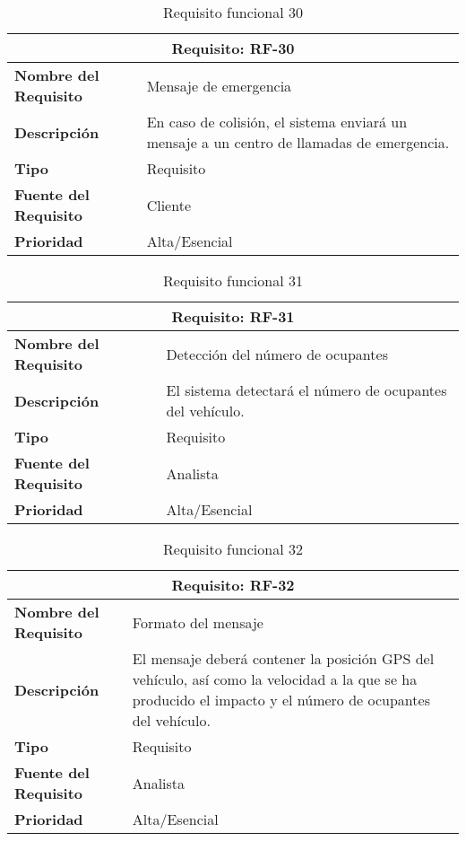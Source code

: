 \begin{table}[H]
\begin{center}
\begin{tabular}{p{} p{7cm}}
\multicolumn{2}{c}{\textbf{Requisito: RF-30} } \\
\hline \hline
\textbf{Nombre del Requisito} & Mensaje de emergencia\\
\hline
\textbf{Descripción} &En caso de colisión, el sistema enviará un mensaje a un centro de llamadas de emergencia.\\
\hline
\textbf{Tipo} & Requisito  \\
\hline
\textbf{Fuente del Requisito} & Cliente  \\
\hline
\textbf{Prioridad} & Alta/Esencial  \\ \hline
\end{tabular}
\caption{Requisito funcional 30}
\label{tab:RF-30}
\end{center}
\end{table}

\begin{table}[H]
\begin{center}
\begin{tabular}{p{} p{7cm}}
\multicolumn{2}{c}{\textbf{Requisito: RF-31} } \\
\hline \hline
\textbf{Nombre del Requisito} & Detección del número de ocupantes\\
\hline
\textbf{Descripción} & El sistema detectará el número de ocupantes del vehículo.\\
\hline
\textbf{Tipo} & Requisito  \\
\hline
\textbf{Fuente del Requisito} & Analista  \\
\hline
\textbf{Prioridad} & Alta/Esencial  \\ \hline
\end{tabular}
\caption{Requisito funcional 31}
\label{tab:RF-31}
\end{center}
\end{table}

\begin{table}[H]
\begin{center}
\begin{tabular}{p{} p{7cm}}
\multicolumn{2}{c}{\textbf{Requisito: RF-32} } \\
\hline \hline
\textbf{Nombre del Requisito} & Formato del mensaje\\
\hline
\textbf{Descripción} & El mensaje deberá contener la posición GPS del vehículo, así como la velocidad a la que se ha producido el impacto y el número de ocupantes del vehículo.\\
\hline
\textbf{Tipo} & Requisito  \\
\hline
\textbf{Fuente del Requisito} & Analista  \\
\hline
\textbf{Prioridad} & Alta/Esencial  \\ \hline
\end{tabular}
\caption{Requisito funcional 32}
\label{tab:RF-32}
\end{center}
\end{table}


